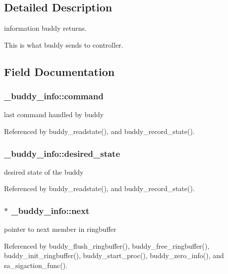 \subsection{Detailed Description}
information buddy returns. 

This is what buddy sends to controller. 

\subsection{Field Documentation}
\subsubsection[{command}]{ {\bf \_\-buddy\_\-info::command}}\label{struct__buddy__info_a411cde42d2b5345a711f9c10888e1198}
last command handled by buddy 

Referenced by buddy\_\-readstate(), and buddy\_\-record\_\-state().

\subsubsection[{desired\_\-state}]{ {\bf \_\-buddy\_\-info::desired\_\-state}}\label{struct__buddy__info_ab0dbf45adc70df2fef1f709781873d5a}
desired state of the buddy 

Referenced by buddy\_\-readstate(), and buddy\_\-record\_\-state().

\subsubsection[{next}]{$\ast$ {\bf \_\-buddy\_\-info::next}}\label{struct__buddy__info_a1b3ee4c22aa391f41272c9b038e1465f}
pointer to next member in ringbuffer 

Referenced by buddy\_\-flush\_\-ringbuffer(), buddy\_\-free\_\-ringbuffer(), buddy\_\-init\_\-ringbuffer(), buddy\_\-start\_\-proc(), buddy\_\-zero\_\-info(), and sa\_\-sigaction\_\-func().

